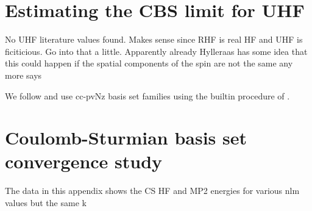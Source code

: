 \begin{appendix}
\chapter{Estimating the CBS limit for UHF}
\label{apx:CbsLimit}
No UHF literature values found.
Makes sense since RHF is real HF and UHF is ficiticious.
Go into that a little.
Apparently already Hylleraas\cite{Hylleraas1929} has some idea that this could
happen if the spatial components of the spin are not the same any more
says \cite{Mestechkin1981}


We follow \cite{Jensen2005} and use cc-pvNz basis set families
using the builtin procedure of \molsturm.


\chapter{Coulomb-Sturmian basis set convergence study}
\label{apx:CSBasisSetConvergence}

The data in this appendix shows the CS HF and MP2 energies
for various nlm values but the same k

\begin{landscape}








\end{landscape}

\begin{landscape}








\end{landscape}

\end{appendix}

